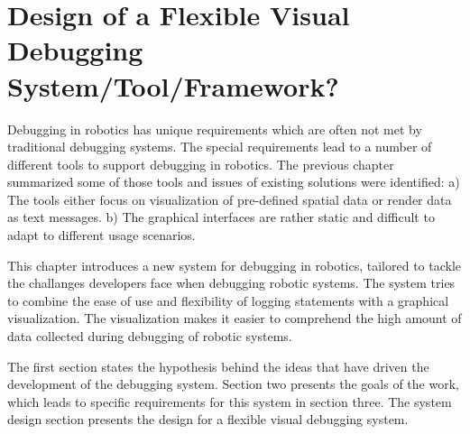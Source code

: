 \chapter{Design of a Flexible Visual Debugging System/Tool/Framework?}
\label{visual_debugging_system}

Debugging in robotics has unique requirements which are often not met by traditional debugging systems. The special requirements lead to a number of different tools to support debugging in robotics. The previous chapter summarized some of those tools and issues of existing solutions were identified: a) The tools either focus on visualization of pre-defined spatial data or render data as text messages. b) The graphical interfaces are rather static and difficult to adapt to different usage scenarios.

This chapter introduces a new system for debugging in robotics, tailored to tackle the challanges developers face when debugging robotic systems. The system tries to combine the ease of use and flexibility of logging statements with a graphical visualization. The visualization makes it easier to comprehend the high amount of data collected during debugging of robotic systems.

The first section states the hypothesis behind the ideas that have driven the development of the debugging system. Section two presents the goals of the work, which leads to specific requirements for this system in section three. The system design section presents the design for a flexible visual debugging system.





